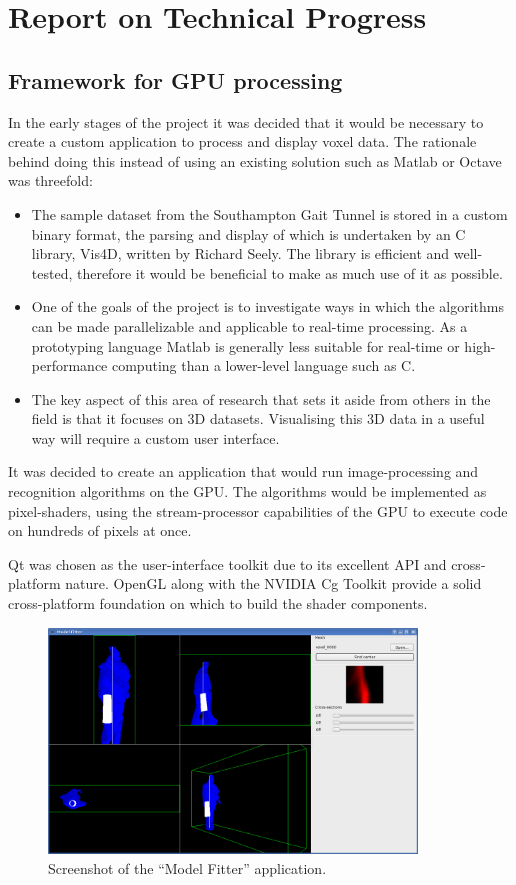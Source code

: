 \section{Report on Technical Progress}

\subsection{Framework for GPU processing}

In the early stages of the project it was decided that it would be necessary to create a custom application to process and display voxel data.
The rationale behind doing this instead of using an existing solution such as Matlab or Octave was threefold:

\begin{itemize}
	\item The sample dataset from the Southampton Gait Tunnel is stored in a custom binary format, the parsing and display of which is
		undertaken by an C library, Vis4D, written by Richard Seely.
		The library is efficient and well-tested, therefore it would be beneficial to make as much use of it as possible.
	\item One of the goals of the project is to investigate ways in which the algorithms can be made parallelizable and applicable to real-time processing.
		As a prototyping language Matlab is generally less suitable for real-time or high-performance computing than a lower-level language such as C.
	\item The key aspect of this area of research that sets it aside from others in the field is that it focuses on 3D datasets.
		Visualising this 3D data in a useful way will require a custom user interface.
\end{itemize}

It was decided to create an application that would run image-processing and recognition algorithms on the GPU.
The algorithms would be implemented as pixel-shaders, using the stream-processor capabilities of the GPU to execute code on hundreds of pixels at once.

Qt \cite{Qt} was chosen as the user-interface toolkit due to its excellent API and cross-platform nature.
OpenGL along with the NVIDIA Cg Toolkit \cite{CgToolkit} provide a solid cross-platform foundation on which to build the shader components.

\begin{figure}[tb]
	\centering
	\includegraphics[height=6cm]{screenshot.png}
	\caption{Screenshot of the ``Model Fitter'' application.}
	\label{Screenshot}
\end{figure}

